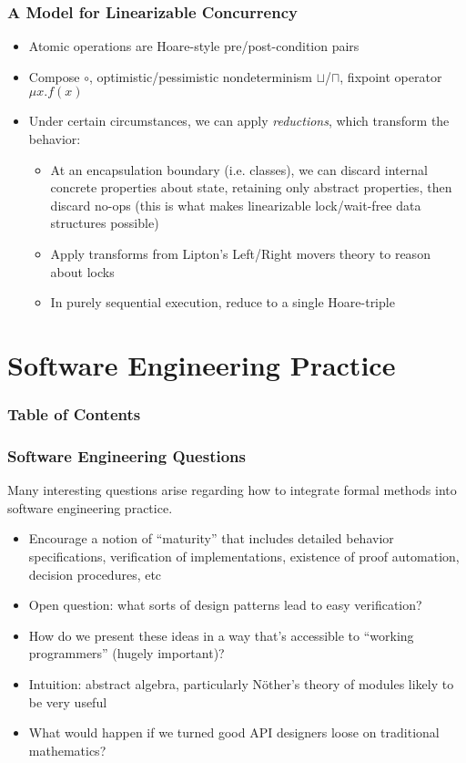 \documentclass{beamer}
\begin{document}
\begin{frame}
  \frametitle{A Model for Linearizable Concurrency}
  \begin{itemize}
    \item Atomic operations are Hoare-style pre/post-condition pairs
    \item Compose $\circ$, optimistic/pessimistic nondeterminism
      $\sqcup$/$\sqcap$, fixpoint operator $\mu x. f(x)$
    \item Under certain circumstances, we can apply \emph{reductions},
      which transform the behavior:
      \begin{itemize}
        \item At an encapsulation boundary (i.e. classes), we can
          discard internal concrete properties about state, retaining
          only abstract properties, then discard no-ops (this is what
          makes linearizable lock/wait-free data structures possible)
        \item Apply transforms from Lipton's Left/Right movers theory
          to reason about locks
        \item In purely sequential execution, reduce to a single
          Hoare-triple
      \end{itemize}
  \end{itemize}
\end{frame}

\section{Software Engineering Practice}

\begin{frame}
  \frametitle{Table of Contents}
  \tableofcontents[currentsection]
\end{frame}


\begin{frame}
  \frametitle{Software Engineering Questions}
  Many interesting questions arise regarding how to integrate
  formal methods into software engineering practice.
  \begin{itemize}
    \item Encourage a notion of ``maturity'' that includes detailed
      behavior specifications, verification of implementations,
      existence of proof automation, decision procedures, etc
    \item Open question: what sorts of design patterns lead to easy
      verification?
    \item How do we present these ideas in a way that's accessible to
     ``working programmers'' (hugely important)?
    \item Intuition: abstract algebra, particularly N\"{o}ther's
      theory of modules likely to be very useful
    \item What would happen if we turned good API designers loose on
      traditional mathematics?
  \end{itemize}
\end{frame}
\end{document}
